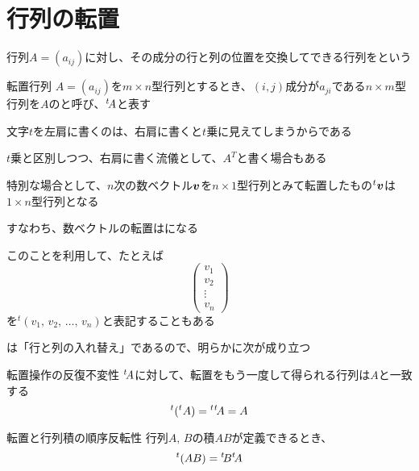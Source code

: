 \documentclass[../../../topic_linear-algebra]{subfiles}
\begin{document}
\sectionline
\section{行列の転置}

行列$A=(a_{ij})$に対し、その成分の行と列の位置を交換してできる行列をという

\begin{definition}{転置行列}
  $A = (a_{ij})$を$m \times n$型行列とするとき、$(i,j)$成分が$a_{ji}$である$n \times m$型行列を$A$のと呼び、${}^t\! A$と表す
\end{definition}

文字$t$を左肩に書くのは、右肩に書くと$t$乗に見えてしまうからである

$t$乗と区別しつつ、右肩に書く流儀として、$A^T$と書く場合もある

\sectionline

特別な場合として、$n$次の数ベクトル$\vb*{v}$を$n \times 1$型行列とみて転置したもの${}^t\vb*{v}$は$1 \times n$型行列となる

すなわち、数ベクトルの転置はになる

\br

このことを利用して、たとえば
\begin{equation*}
  \begin{pmatrix}
    v_1    \\
    v_2    \\
    \vdots \\
    v_n
  \end{pmatrix}
\end{equation*}
を${}^t (v_1,\,v_2,\,\ldots,\,v_n)$と表記することもある

\sectionline

は「行と列の入れ替え」であるので、明らかに次が成り立つ

\begin{theorem}{転置操作の反復不変性}\label{thm:transpose-involution}
  ${}^t\! A$に対して、転置をもう一度して得られる行列は$A$と一致する
  \begin{equation*}
    {}^t ({}^t A) = {}^t{}^t\! A = A
  \end{equation*}
\end{theorem}

\sectionline

\begin{theorem}{転置と行列積の順序反転性}\label{thm:transpose-of-product}
  行列$A,\,B$の積$AB$が定義できるとき、
  \begin{equation*}
    {}^t (AB) = {}^t\! B {}^t\! A
  \end{equation*}
\end{theorem}
\end{document}
